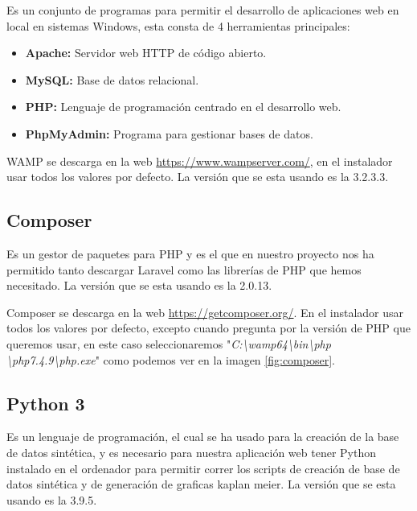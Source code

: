 Es un conjunto de programas para permitir el desarrollo de aplicaciones web en local en sistemas Windows, esta consta de 4 herramientas principales:
\begin{itemize}
    \item \textbf{Apache:} Servidor web HTTP de código abierto.
    \item \textbf{MySQL:} Base de datos relacional. 
    \item \textbf{PHP:} Lenguaje de programación centrado en el desarrollo web.
    \item \textbf{PhpMyAdmin:} Programa para gestionar bases de datos.
\end{itemize}

WAMP se descarga en la web \href{https://www.wampserver.com/}{https://www.wampserver.com/}, en el instalador usar todos los valores por defecto. La versión que se esta usando es la 3.2.3.3.

\subsection{Composer}

Es un gestor de paquetes para PHP y es el que en nuestro proyecto nos ha permitido tanto descargar Laravel como las librerías de PHP que hemos necesitado. La versión que se esta usando es la 2.0.13.

Composer se descarga en la web \href{https://getcomposer.org/}{https://getcomposer.org/}. En el instalador usar todos los valores por defecto, excepto cuando pregunta por la versión de PHP que queremos usar, en este caso seleccionaremos "\textit{C:\textbackslash{}wamp64\textbackslash{}bin\textbackslash{}php\\\textbackslash{}php7.4.9\textbackslash{}php.exe}"{} como podemos ver en la imagen \ref{fig:composer}.


\subsection{Python 3}

Es un lenguaje de programación, el cual se ha usado para la creación de la base de datos sintética, y es necesario para nuestra aplicación web tener Python instalado en el ordenador para permitir correr los scripts de creación de base de datos sintética y de generación de graficas kaplan meier. La versión que se esta usando es la 3.9.5.

